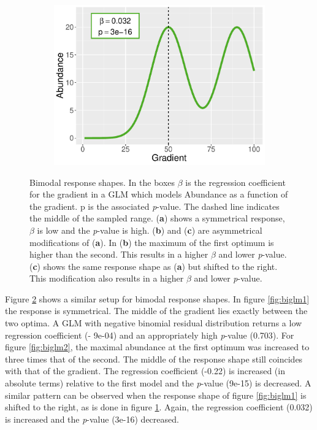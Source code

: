 \begin{figure}[h!]
\begin{subfigure}{0.5\textwidth}
				\includegraphics[width=1\linewidth]{../02_Figures/bi3}
				\caption{}
				\label{fig:biglm3}
			\end{subfigure}
			\caption{
				Bimodal response shapes. 
				In the boxes $\beta$ is the regression coefficient for the gradient in a GLM which models Abundance as a function of the gradient. 
				p is the associated \textit{p}-value. 
				The dashed line indicates the middle of the sampled range.
				(\textbf{a}) shows a symmetrical response, $\beta$ is low and the \textit{p}-value is high. 
				(\textbf{b}) and (\textbf{c}) are asymmetrical modifications of (\textbf{a}). 
				In (\textbf{b}) the maximum of the first optimum is higher than the second. 
				This results in a higher $\beta$ and lower \textit{p}-value. 
				(\textbf{c}) shows the same response shape as (\textbf{a}) but shifted to the right. 
				This modification also results in a higher $\beta$ and lower \textit{p}-value.
			}
			\label{fig:biglm}
		\end{figure}
		
		
		Figure \ref{fig:biglm} shows a similar setup for bimodal response shapes. In figure \ref{fig:biglm1} the response is symmetrical. 
		The middle of the gradient lies exactly between the two optima.
		A GLM with negative binomial residual distribution returns a low regression coefficient (- 9e-04) and an appropriately high \textit{p}-value (0.703).
		For figure \ref{fig:biglm2}, the maximal abundance at the first optimum was increased to three times that of the second.
		The middle of the response shape still coincides with that of the gradient.
		The regression coefficient (-0.22) is increased (in absolute terms) relative to the first model and the \textit{p}-value (9e-15) is decreased. 
		A similar pattern can be observed when the response shape of figure \ref{fig:biglm1} is shifted to the right, as is done in figure \ref{fig:biglm3}.
		Again, the regression coefficient (0.032) is increased and the \textit{p}-value (3e-16) decreased.\\
		
